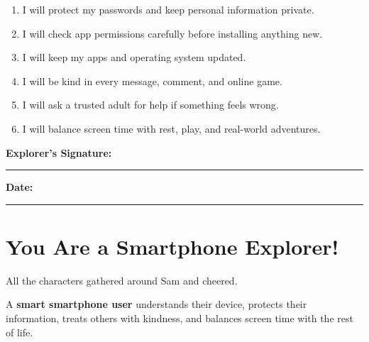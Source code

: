 \begin{enumerate}[label=\textbf{\arabic*.}]
  \item I will protect my passwords and keep personal information private.
  \item I will check app permissions carefully before installing anything new.
  \item I will keep my apps and operating system updated.
  \item I will be kind in every message, comment, and online game.
  \item I will ask a trusted adult for help if something feels wrong.
  \item I will balance screen time with rest, play, and real-world adventures.
\end{enumerate}

\vspace{6pt}
\begin{center}
  \begin{tcolorbox}[colback=SunYellow!15,colframe=SunYellow!70!black,arc=8pt,boxrule=1pt,width=0.9\linewidth]
    \textbf{Explorer's Signature:} \rule{0.48\linewidth}{0.4pt}\hfill
    \textbf{Date:} \rule{0.2\linewidth}{0.4pt}
  \end{tcolorbox}
\end{center}

\sectionrule

\section*{You Are a Smartphone Explorer!}

All the characters gathered around Sam and cheered.


\begin{bigidea}
  A \textbf{smart smartphone user} understands their device,
  protects their information, treats others with kindness,
  and balances screen time with the rest of life.
\end{bigidea}
